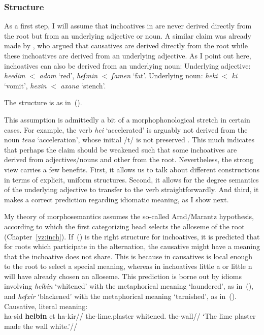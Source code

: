 		\subsubsection{Structure}
As a first step, I will assume that inchoatives in {\thif} are never derived directly from the root but from an underlying adjective or noun. A similar claim was already made by \cite{borer91}, who argued that causatives are derived directly from the root while these inchoatives are derived from an underlying adjective. As I point out here, inchoatives can also be derived from an underlying noun:
\pex
	\a Underlying adjective: \emph{heedim} $<$ \emph{adom} `red', \emph{heʃmin} $<$ \emph{ʃamen} `fat'.
	\a Underlying noun: \emph{heki} $<$ \emph{ki} `vomit', \emph{he{\texttslig}xin} $<$ \emph{{\texttslig}axana} `stench'.
\xe

The structure is as in~(\nextx).
\ex
\xe

This assumption is admittedly a bit of a morphophonological stretch in certain cases. For example, the verb \emph{hei{\texttslig}} `accelerated' is arguably not derived from the noun \emph{teu{\texttslig}a} `acceleration', whose initial /t/ is not preserved \citep{batel94,arad03}. This much indicates that perhaps the claim should be weakened such that some inchoatives are derived from adjectives/nouns and other from the root. Nevertheless, the strong view carries a few benefits. First, it allows us to talk about different constructions in terms of explicit, uniform structures. Second, it allows for the degree semantics of the underlying adjective to transfer to the verb straightforwardly. And third, it makes a correct prediction regarding idiomatic meaning, as I show next.

My theory of morphosemantics assumes the so-called Arad/Marantz hypothesis, according to which the first categorizing head selects the alloseme of the root (Chapter~\ref{vz:inch}). If~(\lastx) is the right structure for inchoatives, it is predicted that for roots which participate in the alternation, the causative might have a meaning that the inchoative does not share. This is because in causatives {\vd} is local enough to the root to select a special meaning, whereas in inchoatives little a or little n will have already chosen an alloseme. This prediction is borne out by idioms involving \emph{helbin} `whitened' with the metaphorical meaning `laundered', as in~(\nextx), and \emph{heʃxir} `blackened' with the metaphorical meaning `tarnished', as in~(\anextx).
\pex
	\a Causative, literal meaning:\\
		\begingl
			\gla ha-sid \textbf{helbin} et ha-kir//
			\glb the-lime.plaster whitened.  the-wall//
			\glft `The lime plaster made the wall white.'//
		\endgl
	
